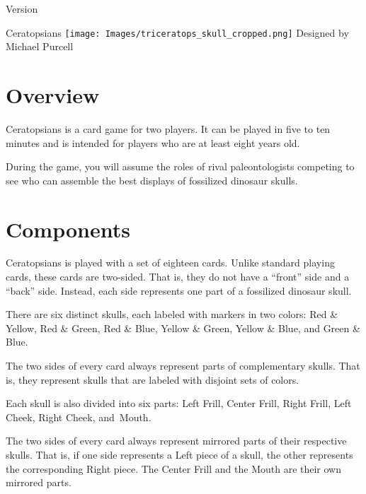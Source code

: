 \documentclass[a6paper, parskip=half, DIV=14, 10pt]{scrartcl}
\begin{document}
{%
\thispagestyle{empty}
		\enlargethispage{3.5\baselineskip} %
\setmainfont[Scale=1.0]{Tex Gyre Pagella}
\begin{center}
\makeatletter
{Version \@version}
\makeatother
\setmainfont[Scale=1.6]{Tex Gyre Pagella}

\Huge
Ceratopsians
\vfill{}
\texttt{[image: Images/triceratops\_skull\_cropped.png]}
\vfill{}
\normalsize
Designed by Michael Purcell
\end{center}
}%
\newpage
\thispagestyle{empty}
\phantom{a}

\newpage
\setmainfont{Tex Gyre Pagella}%
\raggedright%
\section*{Overview}
Ceratopsians is a card game for two players. It can be played in five to ten minutes and is intended for players who are at least eight years old.

During the game, you will assume the roles of rival paleontologists competing to see who can assemble the best displays of fossilized dinosaur skulls.


\section*{Components}
Ceratopsians is played with a set of eighteen cards. Unlike standard playing cards, these cards are two-sided. That is, they do not have a ``front'' side and a ``back'' side. Instead, each side represents one part of a fossilized dinosaur skull.

There are six distinct skulls, each labeled with markers in two colors: Red \& Yellow, Red \& Green, Red \& Blue, Yellow \& Green, Yellow \& Blue, and Green \& Blue.

The two sides of every card always represent parts of complementary skulls. That is, they represent skulls that are labeled with disjoint sets of colors.

\newpage

Each skull is also divided into six parts: Left Frill, Center Frill, Right Frill, Left Cheek, Right Cheek, and~Mouth.

The two sides of every card always represent mirrored parts of their respective skulls.  That is, if one side represents a Left piece of a skull, the other represents the corresponding Right piece.  The Center Frill and the Mouth are their own mirrored parts. 
\end{document}
